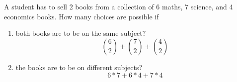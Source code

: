 \item A student has to sell 2 books from a collection of 6 maths, 7 science, and 4 economics books. How many choices are possible if
\begin{enumerate}
    \item both books are to be on the same subject?
    \[ \binom{6}{2} + \binom{7}{2} + \binom{4}{2} \]
    \item the books are to be on different subjects?
    \[ 6 * 7 + 6 * 4 + 7 * 4 \]
\end{enumerate}